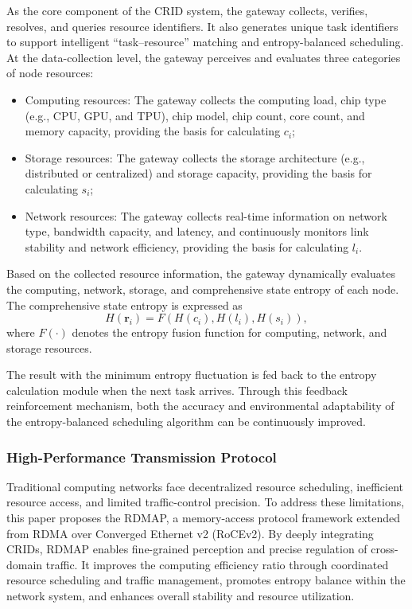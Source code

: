 \documentclass{ccjnl}
\begin{document}
As the core component of the CRID system, the gateway collects,
verifies, resolves, and queries resource identifiers. It also
generates unique task identifiers to support intelligent
“task--resource” matching and entropy-balanced scheduling. At the
data-collection level, the gateway perceives and evaluates three
categories of node resources:

\begin{itemize}[nosep]
	\item Computing resources:
	The gateway collects the computing load, chip type (e.g., CPU, GPU,
	and TPU), chip model, chip count, core count, and memory capacity,
	providing the basis for calculating $c_i$;
	
	\item Storage resources:
	The gateway collects the storage architecture (e.g., distributed
	or centralized) and storage capacity, providing the basis for
	calculating $s_i$;
	
	\item Network resources:
	The gateway collects real-time information on network type,
	bandwidth capacity, and latency, and continuously monitors link
	stability and network efficiency, providing the basis for
	calculating $l_i$.
\end{itemize}

Based on the collected resource information, the gateway dynamically evaluates the computing, network, storage, and comprehensive state entropy of each node. The comprehensive state entropy is expressed as
\begin{equation}
	H(\mathbf{r}_i)=F\left(H(c_i),H(l_i),H(s_i)\right),
	\label{eq:comprehensive-entropy}
\end{equation}
where $F(\cdot)$ denotes the entropy fusion function for computing,
network, and storage resources.

The result with the minimum entropy fluctuation is fed back to the entropy calculation module when the next task arrives. Through this feedback reinforcement mechanism, both the accuracy and environmental adaptability of the entropy-balanced scheduling algorithm can be continuously improved.

\subsubsection{High-Performance Transmission Protocol}
\label{s4-3-2}

Traditional computing networks face decentralized resource scheduling, inefficient resource access, and limited traffic-control precision. To address these limitations, this paper proposes the RDMAP, a memory-access protocol framework extended from RDMA over Converged Ethernet v2 (RoCEv2). By deeply integrating CRIDs, RDMAP enables fine-grained perception and precise regulation of cross-domain traffic. It improves the computing efficiency ratio through coordinated resource scheduling and traffic management, promotes entropy balance within the network system, and enhances overall stability and resource utilization.
\end{document}
